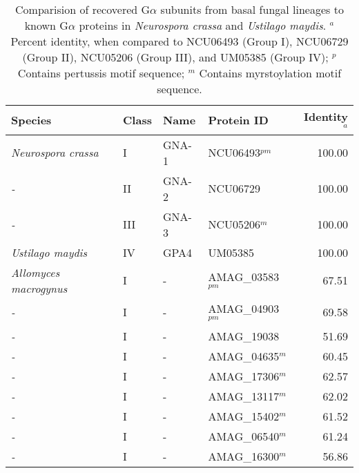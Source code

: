 
{\renewcommand{\arraystretch}{0.5} %
{\footnotesize %
\begin{longtable}{llllr}
\caption[G$\alpha$ subunit comparison]{Comparision of recovered G$\alpha$ subunits from basal fungal lineages to known G$\alpha$ proteins in \textit{Neurospora crassa} and \textit{Ustilago maydis}. $^{a}$ Percent identity, when compared to NCU06493 (Group I), NCU06729 (Group II), NCU05206 (Group III), and UM05385 (Group IV); $^{p}$ Contains pertussis motif sequence; $^{m}$ Contains myrstoylation motif sequence.\label{tab:ChRhodA_GAcomp}} \\
  \hline
Species & Class & Name & Protein ID & Identity$^{a}$ \\ 
  \hline
\emph{Neurospora crassa } & I & GNA-1 & NCU06493$^{pm}$ & 100.00 \\ 
  \emph{-} & II & GNA-2 & NCU06729 & 100.00 \\ 
  \emph{-} & III & GNA-3 & NCU05206$^{m}$ & 100.00 \\ 
  \emph{Ustilago maydis} & IV & GPA4 & UM05385 & 100.00 \\ 
  \emph{Allomyces macrogynus} & I & - & AMAG\_03583$^{pm}$ & 67.51 \\ 
  \emph{-} & I & - & AMAG\_04903$^{pm}$ & 69.58 \\ 
  \emph{-} & I & - & AMAG\_19038 & 51.69 \\ 
  \emph{-} & I & - & AMAG\_04635$^{m}$ & 60.45 \\ 
  \emph{-} & I & - & AMAG\_17306$^{m}$ & 62.57 \\ 
  \emph{-} & I & - & AMAG\_13117$^{m}$ & 62.02 \\ 
  \emph{-} & I & - & AMAG\_15402$^{m}$ & 61.52 \\ 
  \emph{-} & I & - & AMAG\_06540$^{m}$ & 61.24 \\ 
  \emph{-} & I & - & AMAG\_16300$^{m}$ & 56.86 \\ 

\end{longtable}}}
